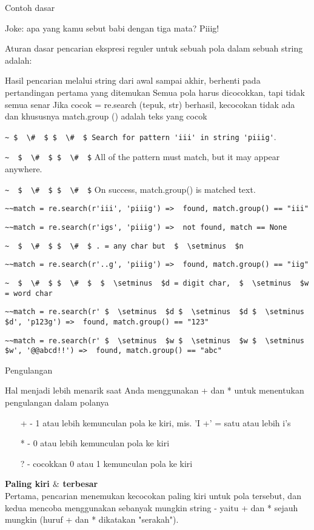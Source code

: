 \begin {enumerate}
\begin {enumerate}
Contoh dasar

Joke: apa yang kamu sebut babi dengan tiga mata? Piiig!

Aturan dasar pencarian ekspresi reguler untuk sebuah pola dalam sebuah string adalah:

Hasil pencarian melalui string dari awal sampai akhir, berhenti pada pertandingan pertama yang ditemukan  Semua pola harus dicocokkan, tapi tidak semua senar Jika cocok = re.search (tepuk, str) berhasil, kecocokan tidak ada dan khususnya match.group () adalah teks yang cocok

\verb|~ $  \#  $ $  \#  $ Search for pattern 'iii' in string 'piiig'|.

\verb|~  $  \#  $ $  \#  $| All of the pattern must match, but it may appear anywhere.

\verb|~  $  \#  $ $  \#  $| On success, match.group() is matched text.

\verb|~~match = re.search(r'iii', 'piiig') =>  found, match.group() == "iii"|

\verb|~~match = re.search(r'igs', 'piiig') =>  not found, match == None|

\verb|~  $  \#  $ $  \#  $ . = any char but  $  \setminus  $n|

\verb|~~match = re.search(r'..g', 'piiig') =>  found, match.group() == "iig"|

\verb|~  $  \#  $ $  \#  $  $  \setminus  $d = digit char,  $  \setminus  $w = word char|

\verb|~~match = re.search(r' $  \setminus  $d $  \setminus  $d $  \setminus  $d', 'p123g') =>  found, match.group() == "123"|

\verb|~~match = re.search(r' $  \setminus  $w $  \setminus  $w $  \setminus  $w', '@@abcd!!') =>  found, match.group() == "abc"|

Pengulangan

Hal menjadi lebih menarik saat Anda menggunakan + dan * untuk menentukan pengulangan dalam polanya

~~~ + - 1 atau lebih kemunculan pola ke kiri, mis. 'I +' = satu atau lebih i's

~~~ * - 0 atau lebih kemunculan pola ke kiri

~~~ ? - cocokkan 0 atau 1 kemunculan pola ke kiri

{\fontsize{14pt}{14pt}\selectfont \textbf{Paling kiri  $  \&  $ terbesar} \\}
Pertama, pencarian menemukan kecocokan paling kiri untuk pola tersebut, dan kedua mencoba menggunakan sebanyak mungkin string - yaitu + dan * sejauh mungkin (huruf + dan * dikatakan "serakah").


\end{enumerate}
\end{enumerate}
